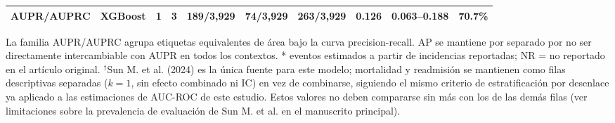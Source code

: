 \begin{table}[H]
\begin{adjustbox}{max width=\textwidth}
\begin{tabular}{llcccccccc}
    AUPR/AUPRC & XGBoost & 1 & 3 & 189/3,929 & 74/3,929 & 263/3,929 & 0.126 & 0.063--0.188 & 70.7\% \\
\bottomrule
\end{tabular}
\end{adjustbox}
\par\vspace{0.4em}\footnotesize La familia AUPR/AUPRC agrupa etiquetas equivalentes de área bajo la curva precision-recall. AP se mantiene por separado por no ser directamente intercambiable con AUPR en todos los contextos. * eventos estimados a partir de incidencias reportadas; NR = no reportado en el artículo original. $^\dagger$Sun M. et al. (2024) es la única fuente para este modelo; mortalidad y readmisión se mantienen como filas descriptivas separadas ($k=1$, sin efecto combinado ni IC) en vez de combinarse, siguiendo el mismo criterio de estratificación por desenlace ya aplicado a las estimaciones de AUC-ROC de este estudio. Estos valores no deben compararse sin más con los de las demás filas (ver limitaciones sobre la prevalencia de evaluación de Sun M. et al. en el manuscrito principal).
\end{table}
